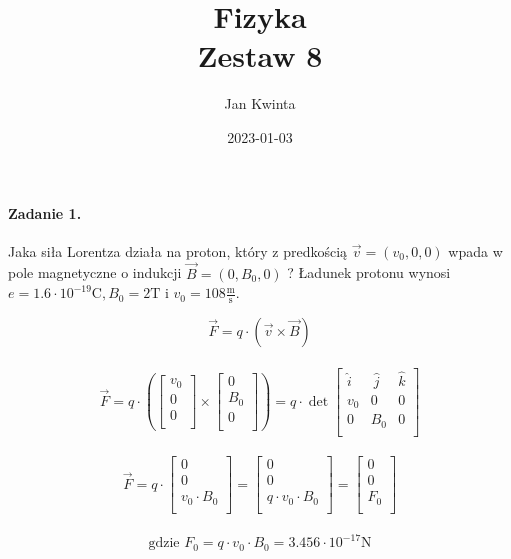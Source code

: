 \documentclass[14pt, table]{extarticle}
\title{Fizyka \\ \Large{Zestaw 8}}
\author{Jan Kwinta}
\date{2023-01-03}
\newcommand{\metr}{\textrm{m}}
\newcommand{\sekunda}{\textrm{s}}
\newcommand{\kulomb}{\textrm{C}}
\newcommand{\tesla}{\textrm{T}}
\newcommand{\newton}{\textrm{N}}
\begin{document}
\maketitle

\paragraph{Zadanie 1.}
Jaka siła Lorentza działa na proton, który z predkością $\vec{v} = (v_0, 0, 0)$ wpada w pole magnetyczne o indukcji $\vec{B} = (0, B_0, 0)$ ? Ładunek protonu wynosi $e = 1.6 \cdot 10^{-19} \kulomb, B_0 = 2 \tesla$ i $v_0 = 108 \frac{\metr}{\sekunda}$.

$$ \vec{F} = q \cdot \left( \vec{v} \times \vec{B} \right) $$ \\
$$ \vec{F} = q \cdot \left( 
\begin{bmatrix}
	v_0 \\
	0 \\
	0 \\
\end{bmatrix}
\times 
\begin{bmatrix}
	0 \\
	B_0 \\
	0 \\
\end{bmatrix} 
\right) = q \cdot \det 
\begin{bmatrix}
	\hat{i} &\ \hat{j} & \hat{k} \\
	v_0 & 0 & 0 \\
	0 & B_0 & 0 \\
\end{bmatrix} $$ \\
$$ \vec{F} = q \cdot 
\begin{bmatrix}
	0 \\
	0 \\
	v_0 \cdot B_0 \\
\end{bmatrix} = 
\begin{bmatrix}
	0 \\
	0 \\
	q \cdot v_0 \cdot B_0\\
\end{bmatrix} =
\begin{bmatrix}
	0 \\
	0 \\
	F_0 \\
\end{bmatrix} $$ \\
$$ \textrm{gdzie } F_0 = q \cdot v_0 \cdot B_0 = 3.456 \cdot 10^{-17} \newton $$
\end{document}
